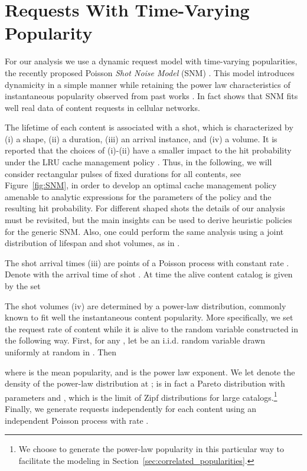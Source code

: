 \documentclass[10pt, conference, letterpaper]{IEEEtran}
\newcommand{\spyros}[1]{{#1}}
\begin{document}
\section{Requests With Time-Varying Popularity}\label{sec:snm}

For our analysis we use a dynamic request model with time-varying popularities, the recently proposed Poisson \emph{Shot Noise Model} (SNM) \cite{traverso2015}.
This model introduces dynamicity in a simple manner while retaining the power law characteristics of instantaneous popularity observed from past works \cite{breslau99,adamic02,newman05}. In fact \cite{traverso2015} shows that SNM fits well real  data \spyros {of content requests in cellular networks}.

The lifetime of each content is associated with a shot, which is characterized by (i) a shape, (ii) a duration, (iii) an arrival instance, and (iv) a volume.
It is reported that the choices of (i)-(ii) have a smaller impact to the hit probability under the LRU cache management policy \cite{traverso2015}. Thus, in the following, we will consider rectangular pulses of fixed durations  for all contents, see Figure~\ref{fig:SNM}, in order to develop an optimal cache management policy amenable to analytic expressions for the parameters of the policy and the resulting hit probability. For different shaped shots the details of our analysis must be revisited, but the main insights can be used to derive heuristic policies for the generic SNM. Also, one could perform the same analysis using a joint distribution of lifespan and shot volumes, as in \cite{olmos2014catalog}. 


The shot arrival times (iii) are points of a Poisson  process with constant rate . 
Denote with  the arrival time of shot .
At time  the alive content catalog is given by the set


The shot volumes (iv) are determined by a power-law distribution, commonly known to fit well the instantaneous content popularity.
More specifically, we set the request rate of content  while it is alive to the random variable  constructed in the following way. First, for any , let  be an i.i.d. random variable drawn uniformly at random in . Then

where  is the mean popularity, and  is the power law exponent. 
{We let  denote the density of the power-law distribution at ;  is in fact a Pareto distribution \spyros {with parameters  and } \cite{newman05}, which is the limit of Zipf distributions for large catalogs.\footnote{We choose to generate the power-law popularity in this particular way to facilitate the modeling in Section~\ref{sec:correlated_popularities}.}}
 Finally, we generate requests independently for each content  using an independent Poisson process with rate .
\end{document}
